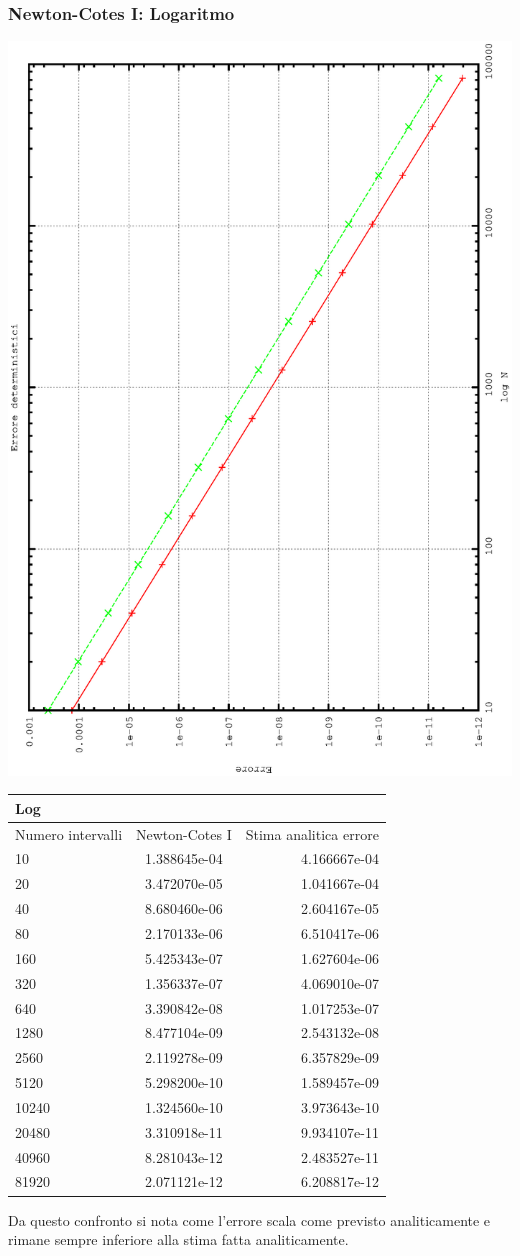 \subsubsection{Newton-Cotes I: Logaritmo}
\begin{center}
\includegraphics[width=0.7\columnwidth,angle=-90]{plot_trap_log.eps}
\end{center}
\begin{center}
\begin{longtable}[h]{lcr}
\toprule
Log &  \\
\midrule
Numero intervalli & Newton-Cotes I & Stima analitica errore  \\
\midrule
10 &	  1.388645e-04  	 & 4.166667e-04 \\ 
20 &	 3.472070e-05  		 & 1.041667e-04 \\ 
40 &	 8.680460e-06  		 & 2.604167e-05 \\ 
80 &	 2.170133e-06  		 & 6.510417e-06 \\ 
160 &	 5.425343e-07  		 & 1.627604e-06 \\ 
320 &	 1.356337e-07  		 & 4.069010e-07 \\ 
640 &	  3.390842e-08  	 & 1.017253e-07 \\ 
1280 &	  8.477104e-09  	 & 2.543132e-08 \\ 
2560 &	  2.119278e-09  	 & 6.357829e-09 \\ 
5120 &	  5.298200e-10  	 & 1.589457e-09 \\ 
10240 &	  1.324560e-10  	 & 3.973643e-10 \\ 
20480 &	  3.310918e-11  	 & 9.934107e-11 \\ 
40960 &	  8.281043e-12  	 & 2.483527e-11 \\ 
81920 &	  2.071121e-12  	 & 6.208817e-12 \\ 
\end{longtable}
\end{center}
Da questo confronto si nota come l'errore scala come previsto analiticamente e rimane sempre inferiore alla stima fatta analiticamente.

